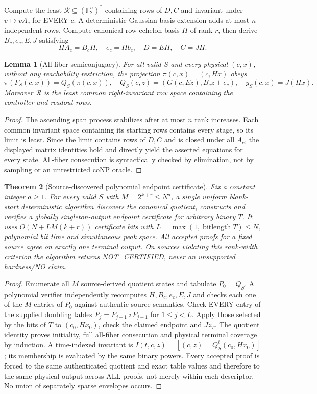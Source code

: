 \documentclass[11pt]{article}
\newtheorem{theorem}{Theorem}
\newtheorem{lemma}[theorem]{Lemma}
\newcommand{\F}{\mathbb F_2}
\begin{document}
Compute the least $\mathcal R\subseteq(\F^n)^*$ containing rows of $D,C$ and invariant under $v\mapsto vA_c$ for EVERY $c$. A deterministic Gaussian basis extension adds at most $n$ independent rows. Compute canonical row-echelon basis $H$ of rank $r$, then derive $B_c,e_c,E,J$ satisfying
\[
 HA_c=B_cH,\quad e_c=Hb_c,\quad D=EH,\quad C=JH.
\]
\begin{lemma}[All-fiber semiconjugacy] For all valid $S$ and every physical $(c,x)$, without any reachability restriction, the projection $\pi(c,x)=(c,Hx)$ obeys
\[
 \pi(F_S(c,x))=Q_S(\pi(c,x)),\quad Q_S(c,z)=(G(c,Ez),B_cz+e_c),\quad y_S(c,x)=J(Hx).
\]
Moreover $\mathcal R$ is the least common right-invariant row space containing the controller and readout rows.
\end{lemma}
\begin{proof}
The ascending span process stabilizes after at most $n$ rank increases. Each common invariant space containing its starting rows contains every stage, so its limit is least. Since the limit contains rows of $D,C$ and is closed under all $A_c$, the displayed matrix identities hold and directly yield the asserted equations for every state. All-fiber consecution is syntactically checked by elimination, not by sampling or an unrestricted coNP oracle.
\end{proof}

\begin{theorem}[Source-discovered polynomial endpoint certificate]
Fix a constant integer $a\ge1$. For every valid $S$ with $M=2^{k+r}\le N^a$, a single uniform blank-start deterministic algorithm discovers the canonical quotient, constructs and verifies a globally singleton-output endpoint certificate for arbitrary binary $T$. It uses $O(N+L M(k+r))$ certificate bits with $L=\max(1,\operatorname{bitlength}T)\le N$, polynomial bit time and simultaneous peak space. All accepted proofs for a fixed source agree on exactly one terminal output. On sources violating this rank-width criterion the algorithm returns NOT\_CERTIFIED, never an unsupported hardness/NO claim.
\end{theorem}
\begin{proof}
Enumerate all $M$ source-derived quotient states and tabulate $P_0=Q_S$. A polynomial verifier independently recomputes $H,B_c,e_c,E,J$ and checks each one of the $M$ entries of $P_0$ against authentic source semantics. Check EVERY entry of the supplied doubling tables $P_j=P_{j-1}\circ P_{j-1}$ for $1\le j<L$. Apply those selected by the bits of $T$ to $(c_0,Hx_0)$, check the claimed endpoint and $Jz_T$. The quotient identity proves initiality, full all-fiber consecution and physical terminal coverage by induction. A time-indexed invariant is $I(t,c,z)=[(c,z)=Q_S^t(c_0,Hx_0)]$; its membership is evaluated by the same binary powers. Every accepted proof is forced to the same authenticated quotient and exact table values and therefore to the same physical output across ALL proofs, not merely within each descriptor. No union of separately sparse envelopes occurs.
\end{proof}
\end{document}
